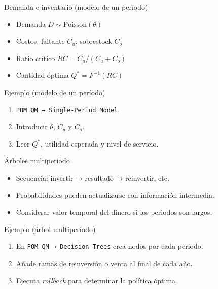 \documentclass{beamer}
\begin{document}
\begin{frame}{Demanda e inventario (modelo de un período)}
  \begin{itemize}
    \item Demanda \(D\sim\text{Poisson}(\theta)\)
    \item Costos: faltante \(C_u\), sobrestock \(C_o\)
    \item Ratio crítico  \(RC=C_u/(C_u+C_o)\)
    \item Cantidad óptima \(Q^{*}=F^{-1}(RC)\)
  \end{itemize}
\end{frame}

\begin{frame}{Ejemplo (modelo de un período)}
  \begin{enumerate}\footnotesize
    \item \texttt{POM QM → Single-Period Model}.
    \item Introducir \(\theta\), \(C_u\) y \(C_o\).
    \item Leer \(Q^{*}\), utilidad esperada y nivel de servicio.
  \end{enumerate}
\end{frame}

\begin{frame}{Árboles multiperíodo}
  \begin{itemize}
    \item Secuencia: invertir → resultado → reinvertir, etc.
    \item Probabilidades pueden actualizarse con información intermedia.
    \item Considerar valor temporal del dinero si los periodos son largos.
  \end{itemize}
\end{frame}

\begin{frame}{Ejemplo (árbol multiperíodo)}
  \begin{enumerate}\footnotesize
    \item En \texttt{POM QM → Decision Trees} crea nodos por cada periodo.
    \item Añade ramas de reinversión o venta al final de cada año.
    \item Ejecuta \textit{rollback} para determinar la política óptima.
  \end{enumerate}
\end{frame}
\end{document}
